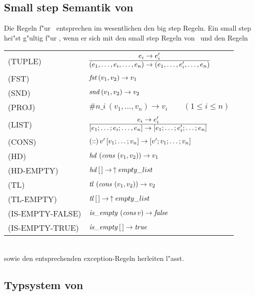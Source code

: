 \subsection{Small step Semantik von \LTHREE}

Die  Regeln f"ur \LTHREE\ entsprechen im wesentlichen den big step Regeln. Ein small step hei"st g"ultig f"ur
\LTHREE, wenn er sich mit den small step Regeln von \LTWO\ und den Regeln\\[5mm]
  \begin{tabular}{ll}
    \mbox{(TUPLE)}          & $\regel{e_i \to e_i'}
                                     {(e_1,\ldots,e_i,\ldots,e_n) \to (e_1,\ldots,e_i',\ldots,e_n)}$ \\[5mm]
    \mbox{(FST)}            & ${\text{\it fst\/}}\,(v_1,v_2) \to v_1$ \\[3mm]
    \mbox{(SND)}            & ${\text{\it snd\/}}\,(v_1,v_2) \to v_2$ \\[3mm]
    \mbox{(PROJ)}           & $\#n\_i\,(v_1,\ldots,v_n) \to v_i \qquad (1 \le i \le n)$ \\[3mm]
    \mbox{(LIST)}           & $\regel{e_i \to e_i'}
                                     {[e_1;\ldots;e_i;\ldots,e_n] \to [e_1;\ldots;e_i';\ldots;e_n]}$ \\[5mm]
    \mbox{(CONS)}           & $(\mathrel{::})\,v'\,[v_1;\ldots;v_n] \to [v';v_1;\ldots;v_n]$ \\[3mm]
    \mbox{(HD)}             & ${\text{\it hd\/}}\,\left({\text{\it cons\/}}\,\left(v_1,v_2\right)\right) \to v_1$ \\[3mm]
    \mbox{(HD-EMPTY)}       & ${\text{\it hd\/}}\,[\,] \to \, \uparrow empty\_list$ \\[3mm]
    \mbox{(TL)}             & ${\text{\it tl\/}}\,\left({\text{\it cons\/}}\,\left(v_1,v_2\right)\right) \to v_2$ \\[3mm]
    \mbox{(TL-EMPTY)}       & ${\text{\it tl\/}}\,[\,] \to \, \uparrow empty\_list$ \\[3mm]
    \mbox{(IS-EMPTY-FALSE)} & ${\text{\it is\_empty\/}}\,\left({\text{\it cons\/}}\,v\right) \to {\text{\it false\/}}$ \\[3mm]
    \mbox{(IS-EMPTY-TRUE)}  & ${\text{\it is\_empty\/}}\,[\,] \to {\text{\it true\/}}$
  \end{tabular}\\[7mm]
sowie den entsprechenden exception-Regeln herleiten l"asst.


\subsection{Typsystem von \LTHREE}

